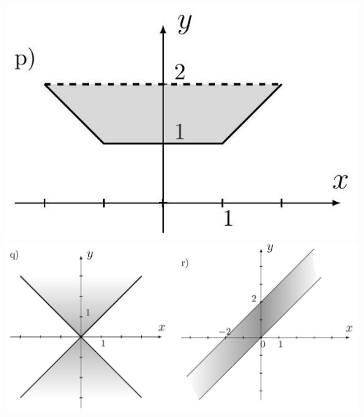 \documentclass[10pt]{article}
\begin{document}
\begin{enumerate}
\includegraphics[max width=\textwidth, center]{2024_11_21_8f01584889ff06348ae7g-070(1)}\\
\includegraphics[max width=\textwidth, center]{2024_11_21_8f01584889ff06348ae7g-071(1)}
\end{enumerate}
\end{document}

